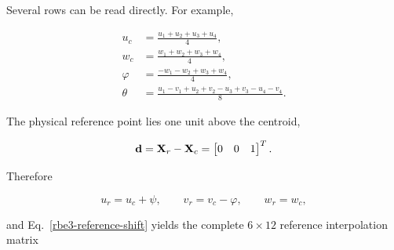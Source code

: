 Several rows can be read directly. For example,

\begin{equation}
\begin{aligned}
 u_c&=\frac{u_1+u_2+u_3+u_4}{4},\\
 w_c&=\frac{w_1+w_2+w_3+w_4}{4},\\
 \varphi&=\frac{-w_1-w_2+w_3+w_4}{4},\\
 \theta&=\frac{u_1-v_1+u_2+v_2-u_3+v_3-u_4-v_4}{8}.
\end{aligned}
\end{equation}

The physical reference point lies one unit above the centroid,

\begin{equation}
    \mathbf{d}=\mathbf{X}_r-\mathbf{X}_c
    =\begin{bmatrix}0&0&1\end{bmatrix}^{T}.
\end{equation}

Therefore

\begin{equation}
    u_r=u_c+\psi,
    \qquad
    v_r=v_c-\varphi,
    \qquad
    w_r=w_c,
\end{equation}

and Eq.~\eqref{rbe3-reference-shift} yields the complete $6\times12$
reference interpolation matrix

